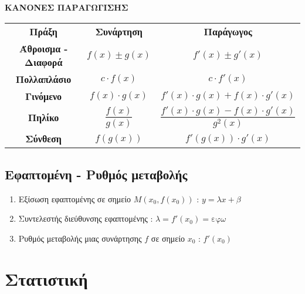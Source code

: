 \documentclass[a4paper,11pt]{article}
\begin{document}
\begin{center}
\vspace{5mm}
\textbf{ΚΑΝΟΝΕΣ ΠΑΡΑΓΩΓΙΣΗΣ}\\
\vspace{5mm}
\begin{tabular}{ccc}
\hline 
\rule[-2ex]{0pt}{5ex} \textbf{Πράξη} & \textbf{Συνάρτηση} & \textbf{Παράγωγος} \\ 
\hhline{===}
\rule[-2ex]{0pt}{5ex} \textbf{Άθροισμα - Διαφορά} & $ f(x)\pm g(x) $ & $ f'(x)\pm g'(x) $ \\ 
\rule[-2ex]{0pt}{5ex} \textbf{Πολλαπλάσιο} & $ c\cdot f(x) $ & $ c\cdot f'(x) $ \\  
\rule[-2ex]{0pt}{5ex} \textbf{Γινόμενο} & $ f(x)\cdot g(x) $ & $ f'(x)\cdot g(x)+f(x)\cdot g'(x) $ \\ 
\rule[-2ex]{0pt}{5ex} \textbf{Πηλίκο} & $ \dfrac{f(x)}{g(x)} $ & $ \dfrac{f'(x)\cdot g(x)-f(x)\cdot g'(x)}{g^2(x)} $ \\  
\rule[-2ex]{0pt}{5ex} \textbf{Σύνθεση} & $ f(g(x)) $ & $ f'(g(x))\cdot g'(x) $ \\ 
\hline 
\end{tabular}\label{pinakas2}
\end{center}
\subsection{Εφαπτομένη - Ρυθμός μεταβολής}
\begin{enumerate}[resume]
\item Εξίσωση εφαπτομένης σε σημείο $M(x_0,f(x_0))$ : $y=\lambda x+\beta$ 
\item Συντελεστής διεύθυνσης εφαπτομένης : $\lambda=f'(x_0)=\textrm{εφ}{\omega}$
\item Ρυθμός μεταβολής μιας συνάρτησης $f$ σε σημείο $x_0$ : $f'(x_0)$
\end{enumerate}
\section{Στατιστική}
\end{document}

